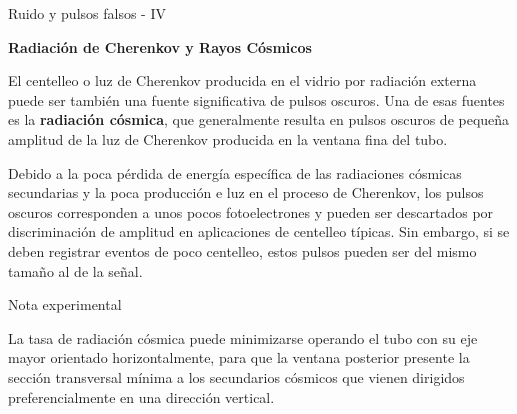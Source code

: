 \documentclass[a4paper,10pt]{beamer}
\begin{document}
\begin{frame}{Ruido y pulsos falsos - IV}
 
  {\Large{\textbf{\color{blue}Radiación de Cherenkov y Rayos Cósmicos}}}

 \begin{justify} 
 
 El centelleo o luz de Cherenkov producida en el vidrio por radiación externa puede 
 ser también una fuente significativa de pulsos oscuros. Una de esas fuentes es la 
 \textbf{radiación cósmica}, que generalmente resulta en pulsos oscuros de pequeña amplitud 
 de la luz de Cherenkov producida en la ventana fina del tubo.
 
 \vspace{.3cm}
 
 Debido a la poca pérdida de energía específica de las radiaciones cósmicas 
 secundarias y la poca producción e luz en el proceso de Cherenkov, los pulsos 
 oscuros corresponden a unos pocos fotoelectrones y pueden ser descartados 
 por discriminación de amplitud en aplicaciones de centelleo típicas. Sin embargo,
  si se deben registrar eventos de poco centelleo, estos pulsos pueden ser 
  del mismo tamaño al de la señal.
  
  \begin{exampleblock}{Nota experimental}
  \begin{justify}
  La tasa de radiación cósmica puede minimizarse operando el tubo con su eje 
  mayor orientado horizontalmente, para que la ventana posterior presente la
  sección transversal mínima a los secundarios cósmicos que vienen dirigidos 
  preferencialmente en una dirección vertical.
  \end{justify} 
  \end{exampleblock}
 
\end{justify} 
\end{frame}
\end{document}
